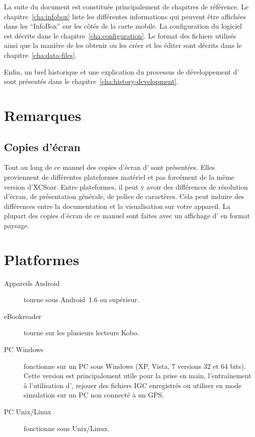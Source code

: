 La suite du document est constituée principalement de chapitres de référence. Le chapitre~\ref{cha:infobox} liste les différentes informations qui peuvent être affichées dans les ``InfoBox'' sur les côtés de la carte mobile. La configuration du logiciel est décrite dans le chapitre~\ref{cha:configuration}. Le format des fichiers utilisés ainsi que la manière de les obtenir ou les créer et les éditer sont décrits dans le chapitre~\ref{cha:data-files}.

Enfin, un bref historique et une explication du processus de développement d'\xc{} sont présentés dans le chapitre~\ref{cha:history-development}.

\section{Remarques}

\subsection*{Copies d'écran}
Tout au long de ce manuel des copies d'écran d'\xc{} sont présentées. Elles proviennent de différentes plateformes matériel et pas forcément de la même version d'XCSoar. Entre plateformes, il peut y avoir des différences de résolution d'écran, de présentation générale, de police de caractères. Cela peut induire des différences entre la documentation et la visualisation sur votre appareil. La plupart des copies d'écran de ce manuel sont faites avec un affichage d'\xc{} en format paysage.

\section{Platformes}
\begin{description}
\item[Appareils Android]
\xc{} tourne sous Android~1.6 ou supérieur.
\item [eBookreader]
\xc{} tourne sur les plusieurs lecteurs Kobo.
\item[PC Windows]
\xc{} fonctionne sur un PC sous Windows (XP, Vista, 7 versions 32 et 64 bits). Cette version est principalement utile pour la prise en main, l'entraînement à l'utilisation d'\xc, rejouer des fichiers IGC enregistrés ou utiliser \xc{} en mode simulation sur un PC non connecté à un GPS.
\item[PC Unix/Linux]
\xc{} fonctionne sous Unix/Linux.
\end{description}


